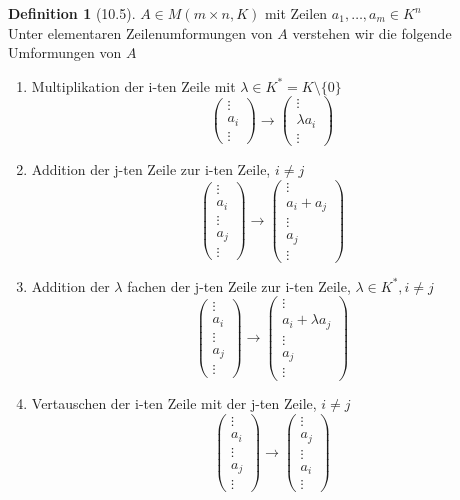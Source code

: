 \documentclass[a4paper]{scrartcl}
\theoremstyle{definition}
\newtheorem{defn}{Definition}
\theoremstyle{plain}
\theoremstyle{plain}
\theoremstyle{remark}
\theoremstyle{remark}
\theoremstyle{remark}
\theoremstyle{remark}
\theoremstyle{remark}
\begin{document}
\begin{defn}[10.5]
$A \in M(m\times n, K)$ mit Zeilen $a_1, \ldots, a_m \in K^n$ \\
  Unter elementaren Zeilenumformungen von $A$ verstehen wir die folgende Umformungen von $A$
\begin{enumerate}
\item Multiplikation der i-ten Zeile mit $\lambda \in K^\ast = K \setminus\{0\}$
         \[\begin{pmatrix} \vdots \\ a_i \\ \vdots \end{pmatrix} \to \begin{pmatrix} \vdots \\ \lambda a_i \\ \vdots \end{pmatrix}\]
\item Addition der j-ten Zeile zur i-ten Zeile, $i\neq j$
         \[\begin{pmatrix} \vdots \\ a_i \\ \vdots \\ a_j \\ \vdots\end{pmatrix} \to \begin{pmatrix} \vdots \\ a_i + a_j \\ \vdots \\ a_j  \\ \vdots \end{pmatrix}\]
\item Addition der $\lambda$ fachen der j-ten Zeile zur i-ten Zeile, $\lambda \in K^\ast, i\neq j$
         \[\begin{pmatrix} \vdots \\ a_i \\ \vdots \\ a_j \\ \vdots\end{pmatrix} \to \begin{pmatrix} \vdots \\ a_i + \lambda a_j \\ \vdots \\ a_j  \\ \vdots \end{pmatrix}\]
\item Vertauschen der i-ten Zeile mit der j-ten Zeile, $i\neq j$
         \[\begin{pmatrix} \vdots \\ a_i \\ \vdots \\ a_j \\ \vdots\end{pmatrix} \to \begin{pmatrix} \vdots \\ a_j \\ \vdots \\ a_i  \\ \vdots \end{pmatrix}\]
\end{enumerate}
\end{defn}
\end{document}
